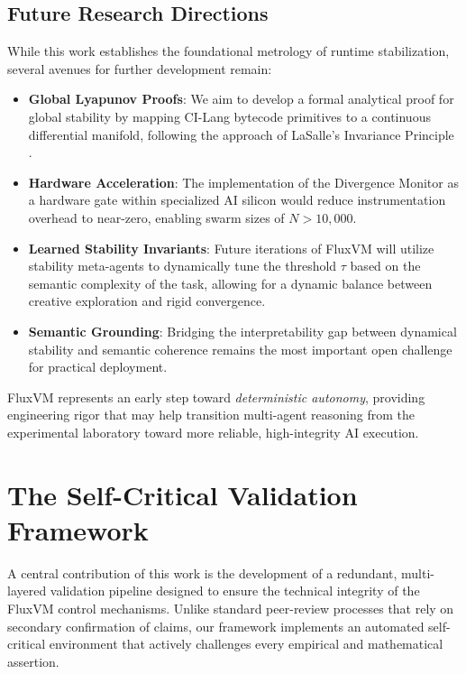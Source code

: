 \documentclass{article}
\begin{document}
\subsection{Future Research Directions}
While this work establishes the foundational metrology of runtime stabilization, several avenues for further development remain:
\begin{itemize}
    \item \textbf{Global Lyapunov Proofs}: We aim to develop a formal analytical proof for global stability by mapping CI-Lang bytecode primitives to a continuous differential manifold, following the approach of LaSalle's Invariance Principle \cite{lasalle1960some}.
    \item \textbf{Hardware Acceleration}: The implementation of the Divergence Monitor as a hardware gate within specialized AI silicon would reduce instrumentation overhead to near-zero, enabling swarm sizes of $N > 10,000$.
    \item \textbf{Learned Stability Invariants}: Future iterations of FluxVM will utilize stability meta-agents to dynamically tune the threshold $\tau$ based on the semantic complexity of the task, allowing for a dynamic balance between creative exploration and rigid convergence.
    \item \textbf{Semantic Grounding}: Bridging the interpretability gap between dynamical stability and semantic coherence remains the most important open challenge for practical deployment.
\end{itemize}

FluxVM represents an early step toward \textit{deterministic autonomy}, providing engineering rigor that may help transition multi-agent reasoning from the experimental laboratory toward more reliable, high-integrity AI execution.

\newpage

\section{The Self-Critical Validation Framework}
\label{sec:validation_framework}

A central contribution of this work is the development of a redundant, multi-layered validation pipeline designed to ensure the technical integrity of the FluxVM control mechanisms. Unlike standard peer-review processes that rely on secondary confirmation of claims, our framework implements an automated self-critical environment that actively challenges every empirical and mathematical assertion.
\end{document}
